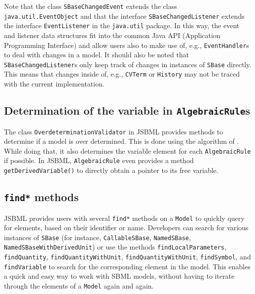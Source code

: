 Note that the class \texttt{SBaseChangedEvent}
%
extends the class
\texttt{java.util.EventObject}
and that the interface \texttt{SBaseChangedListener}
%
%
extends the interface \texttt{EventListener}
%
in the \texttt{java.util} package. In this way, the event and listener data
structures fit into the common Java\texttrademark{} API (Application Programming Interface) and
allow users also to make use of, e.g., \texttt{EventHandler}s to deal with
changes in a model. It should also be noted that \texttt{SBaseChangedListener}s
only keep track of changes in instances of \texttt{SBase} directly. This means
that changes inside of, e.g., \texttt{CVTerm}
or \texttt{History} may not be
traced with the current implementation.


\subsection{Determination of the variable in \texttt{AlgebraicRule}s}

The class \texttt{OverdeterminationValidator}
%
in JSBML provides methods to
determine if a model
is over determined. This is done using the algorithm of \citet{Hopcroft1973}.
While doing that, it also determines the variable element for each
\texttt{AlgebraicRule} if
possible. In JSBML, \texttt{AlgebraicRule} even provides a method
\texttt{getDerivedVariable()} to directly obtain a pointer to its free variable.


\subsection{\texttt{find*} methods}

JSBML provides users with several \texttt{find*} methods
%
on a \texttt{Model}
%
to quickly query for elements, based on their identifier or name. Developers can
search for various instances of \texttt{SBase} (for instance,
\texttt{CallableSBase},
%
\texttt{NamedSBase},
%
\texttt{NamedSBaseWithDerivedUnit})
%
or use the methods \texttt{findLocalParameters}, \texttt{findQuantity},
\texttt{findQuantityWithUnit}, \texttt{findQuantityWithUnit},
\texttt{findSymbol}, and \texttt{findVariable} to search for the corresponding
element in the model. This enables a quick and easy way to work with SBML
models, without having to iterate through the elements of a \texttt{Model} again
and again.

